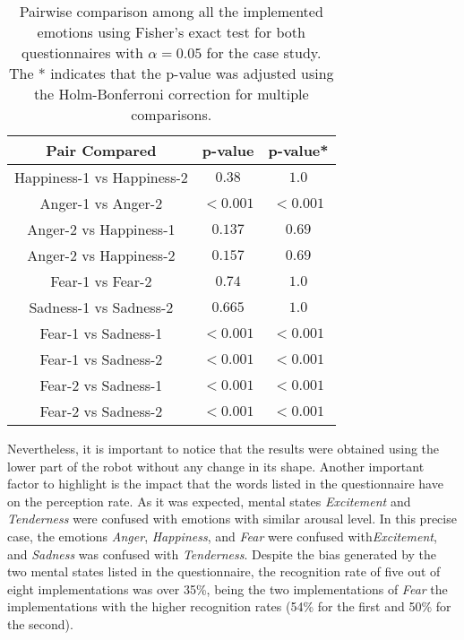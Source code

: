 \begin{table}
\centering
\small
\caption{Pairwise comparison among all the implemented emotions using Fisher's exact test for both questionnaires with $\alpha = 0.05$ for the  case study. The * indicates that the p-value was adjusted using the Holm-Bonferroni correction for multiple comparisons.}
		\label{table:result_compare_fourth}
		\begin{tabular}{|c|c|c|}
			\hline	
\textbf{Pair Compared} & \textbf{p-value} & \textbf{p-value*}\\	
			\hline
			Happiness-1 vs Happiness-2 &$0.38$&$1.0$\\
			\hline
			Anger-1 vs Anger-2 & $<0.001$ 
			& $<0.001$
			\\
			\hline
			Anger-2 vs Happiness-1 & $0.137$&$0.69$\\
			\hline
			Anger-2 vs Happiness-2 & $0.157$&$0.69$\\
			\hline
			Fear-1 vs Fear-2 & $0.74$&$1.0$\\
			\hline
			Sadness-1 vs Sadness-2 & $0.665$&$1.0$\\
			\hline
			Fear-1 vs Sadness-1& $<0.001$ 
			& $<0.001$
			\\
			\hline
			Fear-1 vs Sadness-2 & $<0.001$
			& $<0.001$
			\\
			\hline
			Fear-2 vs Sadness-1 & $<0.001$
			& $<0.001$
			\\
			\hline
			Fear-2 vs Sadness-2 & $<0.001$
			& $<0.001$
			\\
			\hline
			\end{tabular}
\end{table}  
 
Nevertheless, it is important to notice that the results were obtained using the lower part of the robot without any change in its shape. Another important factor to highlight is the impact that the words listed in the questionnaire have on the perception rate. As it was expected, mental states \textit{Excitement} and \textit{Tenderness} were confused with emotions with similar arousal level. In this precise case, the emotions \textit{Anger}, \textit{Happiness}, and \textit{Fear} were confused with\textit{Excitement}, and \textit{Sadness} was confused with \textit{Tenderness}. Despite the bias generated by the two mental states listed in the questionnaire, the recognition rate of five out of eight implementations was over 35\%, being the two implementations of \textit{Fear} the implementations with the higher recognition rates (54\% for the first and 50\% for the second).

